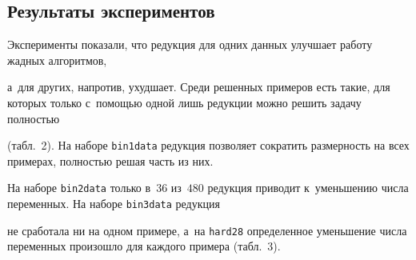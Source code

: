 \subsection{Результаты экспериментов}



Эксперименты показали, что редукция для одних данных улуч\-ша\-ет работу жад\-ных алгоритмов, 

а~для других, напротив, ухуд\-ша\-ет. Среди решенных примеров есть такие, для которых только с~по\-мощью одной лишь редукции мож\-но решить задачу пол\-ностью 

(табл.~2). На наборе \texttt{bin1data} редукция позволяет со\-кра\-тить раз\-мер\-ность на всех примерах,  пол\-ностью решая часть из них. 

На наборе \texttt{bin2data} только в~$36$ из~$480$ редукция приводит к~уменьшению чис\-ла переменных. На наборе \texttt{bin3data} редукция 

не сработала ни на одном примере, а~на \texttt{hard28} определенное уменьшение чис\-ла переменных произошло для каж\-до\-го примера (табл.~3).



